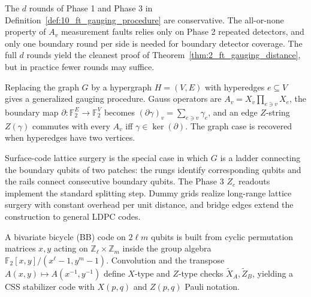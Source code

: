 \begin{remark}
\label{rem:16_boundary_rounds_overkill}
\leanok
The $d$ rounds of Phase 1 and Phase 3 in Definition~\ref{def:10_ft_gauging_procedure} are
conservative. The all-or-none property of $A_v$ measurement faults relies only on Phase 2
repeated detectors, and only one boundary round per side is needed for boundary detector
coverage. The full $d$ rounds yield the cleanest proof of
Theorem~\ref{thm:2_ft_gauging_distance}, but in practice fewer rounds may suffice.
\end{remark}

\begin{remark}
\label{rem:17_hypergraph_generalization}
\leanok
Replacing the graph $G$ by a hypergraph $H = (V, E)$ with hyperedges $e \subseteq V$ gives
a generalized gauging procedure. Gauss operators are $A_v = X_v \prod_{e \ni v} X_e$, the
boundary map $\partial : \mathbb{F}_2^E \to \mathbb{F}_2^V$ becomes
$(\partial \gamma)_v = \sum_{e \ni v} \gamma_e$, and an edge $Z$-string $Z(\gamma)$ commutes
with every $A_v$ iff $\gamma \in \ker(\partial)$. The graph case is recovered when hyperedges
have two vertices.
\end{remark}

\begin{remark}
\label{rem:18_relation_to_lattice_surgery}
\leanok
Surface-code lattice surgery is the special case in which $G$ is a ladder connecting the
boundary qubits of two patches: the rungs identify corresponding qubits and the rails connect
consecutive boundary qubits. The Phase 3 $Z_e$ readouts implement the standard splitting
step. Dummy grids realize long-range lattice surgery with constant overhead per unit
distance, and bridge edges extend the construction to general LDPC codes.
\end{remark}

\begin{remark}
\label{rem:19_bivariate_bicycle_code_notation}
\leanok
A bivariate bicycle (BB) code on $2\ell m$ qubits is built from cyclic permutation matrices
$x, y$ acting on $\mathbb{Z}_\ell \times \mathbb{Z}_m$ inside the group algebra
$\mathbb{F}_2[x,y]/(x^\ell - 1, y^m - 1)$. Convolution and the transpose
$A(x,y) \mapsto A(x^{-1}, y^{-1})$ define $X$-type and $Z$-type checks
$\tilde X_A, \tilde Z_B$, yielding a CSS stabilizer code with $X(p,q)$ and $Z(p,q)$ Pauli
notation.
\end{remark}

